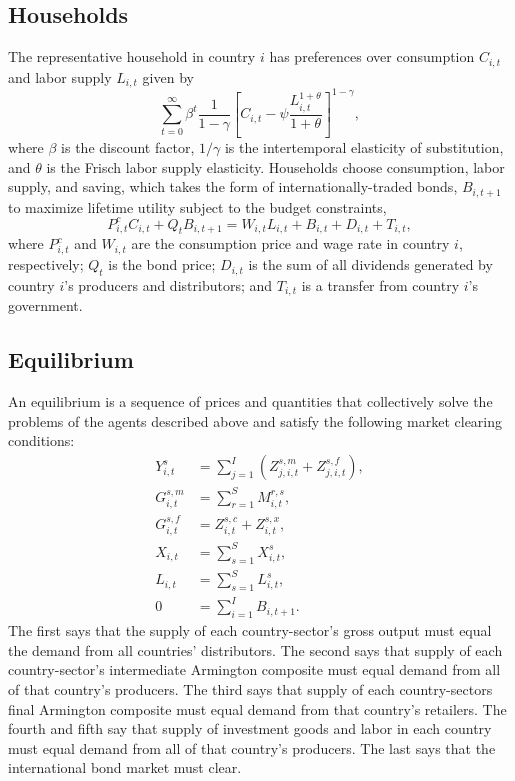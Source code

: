 \documentclass[12pt]{article}
\begin{document}
\subsection{Households}
The representative household in country $i$ has preferences over consumption $C_{i,t}$ and labor supply $L_{i,t}$ given by
\begin{equation}
    \sum_{t=0}^\infty \beta^t \frac{1}{1-\gamma}\left[C_{i,t}-\psi\frac{L_{i,t}^{1+\theta}}{1+\theta}\right]^{1-\gamma},
\end{equation}
where $\beta$ is the discount factor, $1/\gamma$ is the intertemporal elasticity of substitution, and $\theta$ is the Frisch labor supply elasticity. Households choose consumption, labor supply, and saving, which takes the form of internationally-traded bonds, $B_{i,t+1}$ to maximize lifetime utility subject to the budget constraints,
\begin{equation}
    P^c_{i,t}C_{i,t} + Q_t B_{i,t+1} = W_{i,t}L_{i,t}+B_{i,t}+D_{i,t}+T_{i,t},
\end{equation}
where $P^c_{i,t}$ and $W_{i,t}$ are the consumption price and wage rate in country $i$, respectively; $Q_t$ is the bond price; $D_{i,t}$ is the sum of all dividends generated by country $i$'s producers and distributors; and $T_{i,t}$ is a transfer from country $i$'s government.

\subsection{Equilibrium}
An equilibrium is a sequence of prices and quantities that collectively solve the problems of the agents described above and satisfy the following market clearing conditions:
\begin{align}
    Y^s_{i,t} & = \sum_{j=1}^I \left(Z^{s,m}_{j,i,t} + Z^{s,f}_{j,i,t}\right),\\
    G^{s,m}_{i,t} &= \sum_{r=1}^S M^{r,s}_{i,t},\\
    G^{s,f}_{i,t} &= Z^{s,c}_{i,t}+Z^{s,x}_{i,t},\\
    X_{i,t} &= \sum_{s=1}^S X^s_{i,t},\\
    L_{i,t} &= \sum_{s=1}^S L^s_{i,t},\\
    0 & = \sum_{i=1}^I B_{i,t+1}.\label{eq:bmkt}
\end{align}
The first says that the supply of each country-sector's gross output must equal the demand from all countries' distributors. The second says that supply of each country-sector's intermediate Armington composite must equal demand from all of that country's producers. The third says that supply of each country-sectors final Armington composite must equal demand from that country's retailers. The fourth and fifth say that supply of investment goods and labor in each country must equal demand from all of that country's producers. The last says that the international bond market must clear.
\end{document}
